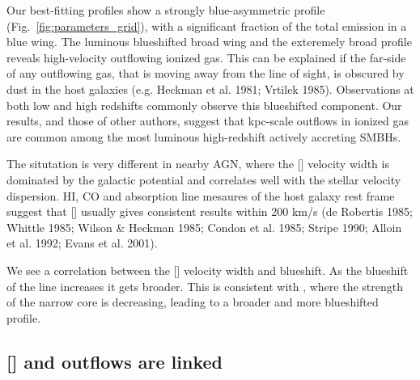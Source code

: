 Our best-fitting profiles show a strongly blue-asymmetric profile (Fig.~\ref{fig:parameters_grid}), with a significant fraction of the total emission in a blue wing.
The luminous blueshifted broad wing and the exteremely broad profile reveals high-velocity outflowing ionized gas. 
This can be explained if the far-side of any outflowing gas, that is moving away from the line of sight, is obscured by dust in the host galaxies (e.g. Heckman et al. 1981; Vrtilek 1985). 
Observations at both low and high redshifts commonly observe this blueshifted component.  
Our results, and those of other authors, suggest that kpc-scale outflows in ionized gas are common among the most luminous high-redshift actively accreting SMBHs.

The situtation is very different in nearby AGN, where the [] velocity width is dominated by the galactic potential and correlates well with the stellar velocity dispersion.
HI, CO and absorption line mesaures of the host galaxy rest frame suggest that [] usually gives consistent results within 200 km/s (de Robertis 1985; Whittle 1985; Wilson \& Heckman 1985; Condon et al. 1985; Stripe 1990; Alloin et al. 1992; Evans et al. 2001).  

We see a correlation between the [] velocity width and blueshift. 
As the blueshift of the line increases it gets broader. 
This is consistent with \citet{shen14}, where the strength of the narrow core is decreasing, leading to a broader and more blueshifted profile. 


\subsection{[] and  outflows are linked}

